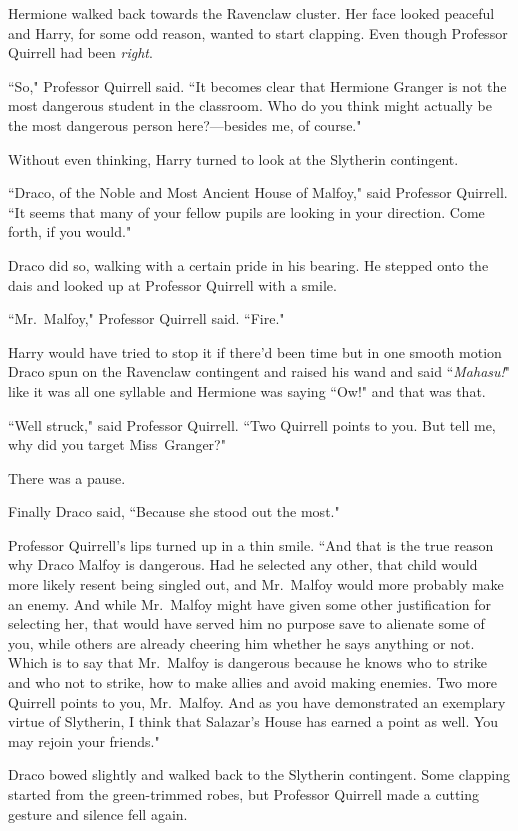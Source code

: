 Hermione walked back towards the Ravenclaw cluster. Her face looked peaceful and Harry, for some odd reason, wanted to start clapping. Even though Professor Quirrell had been \emph{right}.

``So," Professor Quirrell said. ``It becomes clear that Hermione Granger is not the most dangerous student in the classroom. Who do you think might actually be the most dangerous person here?—besides me, of course."

Without even thinking, Harry turned to look at the Slytherin contingent.

``Draco, of the Noble and Most Ancient House of Malfoy," said Professor Quirrell. ``It seems that many of your fellow pupils are looking in your direction. Come forth, if you would."

Draco did so, walking with a certain pride in his bearing. He stepped onto the dais and looked up at Professor Quirrell with a smile.

``Mr.~Malfoy," Professor Quirrell said. ``Fire."

Harry would have tried to stop it if there'd been time but in one smooth motion Draco spun on the Ravenclaw contingent and raised his wand and said ``\emph{Mahasu!}" like it was all one syllable and Hermione was saying ``Ow!" and that was that.

``Well struck," said Professor Quirrell. ``Two Quirrell points to you. But tell me, why did you target Miss~Granger?"

There was a pause.

Finally Draco said, ``Because she stood out the most."

Professor Quirrell's lips turned up in a thin smile. ``And that is the true reason why Draco Malfoy is dangerous. Had he selected any other, that child would more likely resent being singled out, and Mr.~Malfoy would more probably make an enemy. And while Mr.~Malfoy might have given some other justification for selecting her, that would have served him no purpose save to alienate some of you, while others are already cheering him whether he says anything or not. Which is to say that Mr.~Malfoy is dangerous because he knows who to strike and who not to strike, how to make allies and avoid making enemies. Two more Quirrell points to you, Mr.~Malfoy. And as you have demonstrated an exemplary virtue of Slytherin, I think that Salazar's House has earned a point as well. You may rejoin your friends."

Draco bowed slightly and walked back to the Slytherin contingent. Some clapping started from the green-trimmed robes, but Professor Quirrell made a cutting gesture and silence fell again.

